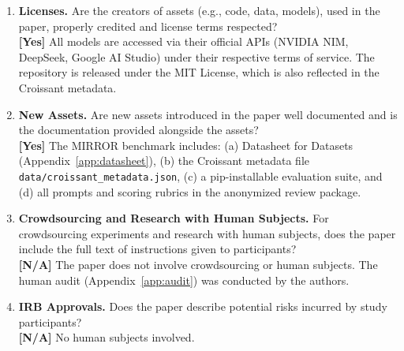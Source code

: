 \documentclass[10pt]{article}
\begin{document}
\begin{enumerate}
\item \textbf{Licenses.} Are the creators of assets (e.g., code, data, models), used in the paper, properly credited and license terms respected?
\\\textbf{[Yes]} All models are accessed via their official APIs (NVIDIA NIM, DeepSeek, Google AI Studio) under their respective terms of service. The repository is released under the MIT License, which is also reflected in the Croissant metadata.

\item \textbf{New Assets.} Are new assets introduced in the paper well documented and is the documentation provided alongside the assets?
\\\textbf{[Yes]} The MIRROR benchmark includes: (a) Datasheet for Datasets (Appendix~\ref{app:datasheet}), (b) the Croissant metadata file \texttt{data/croissant\_metadata.json}, (c) a pip-installable evaluation suite, and (d) all prompts and scoring rubrics in the anonymized review package.

\item \textbf{Crowdsourcing and Research with Human Subjects.} For crowdsourcing experiments and research with human subjects, does the paper include the full text of instructions given to participants?
\\\textbf{[N/A]} The paper does not involve crowdsourcing or human subjects. The human audit (Appendix~\ref{app:audit}) was conducted by the authors.

\item \textbf{IRB Approvals.} Does the paper describe potential risks incurred by study participants?
\\\textbf{[N/A]} No human subjects involved.

\end{enumerate}
\end{document}
